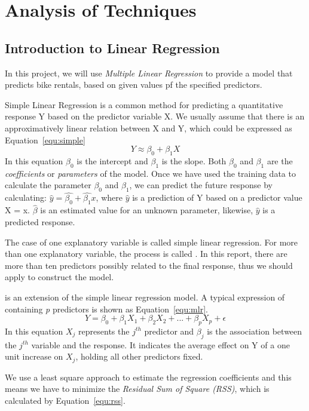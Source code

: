\section{Analysis of Techniques}
\label{sec:technique}
\subsection{Introduction to Linear Regression}
In this project, we will use \emph{Multiple Linear Regression} to provide a model that predicts bike rentals, based on given values pf the specified predictors.

Simple Linear Regression is a common method for predicting a quantitative response Y based on the predictor variable X. We usually assume that there is an approximatively linear relation between X and Y, which could be expressed as Equation~\ref{equ:simple}
\begin{equation}\label{equ:simple}
  Y \approx \beta_0+\beta_1X
\end{equation}
In this equation $\beta_0$ is the intercept and $\beta_1$ is the slope. Both $\beta_0$ and $\beta_1$ are the \emph{coefficients} or \emph{parameters} of the model.
Once we have used the training data to calculate the parameter $\beta_0$ and $\beta_1$, we can predict the future response by calculating: $\hat{y} = \hat{\beta_0} + \hat{\beta_1}x$, where $\hat{y}$ is a prediction of Y based on a predictor value X = x. $\hat{\beta}$ is an estimated value for an unknown parameter, likewise, $\hat{y}$ is a predicted response.

The case of one explanatory variable is called simple linear regression. For more than one explanatory variable, the process is called \mlr. In this report, there are more than ten predictors possibly related to the final response, thus we should apply {\mlr} to construct the model.

{\Mlr} is an extension of the simple linear regression model. A typical expression of {\mlr} containing \textit{p} predictors is shown as Equation~\ref{equ:mlr}.
\begin{equation}\label{equ:mlr}
  Y = \beta_0 + \beta_1X_1 + \beta_2X_2 + ... + \beta_pX_p + \epsilon
\end{equation}
In this equation $X_j$ represents the $j^{th}$ predictor and $\beta_j$ is the association between the $j^{th}$ variable and the response. It indicates the average effect on Y of a one unit increase on $X_j$, holding all other predictors fixed.

We use a least square approach to estimate the regression coefficients and this means we have to minimize the \emph{Residual Sum of Square (RSS)}, which is calculated by Equation~\ref{equ:rss}.

